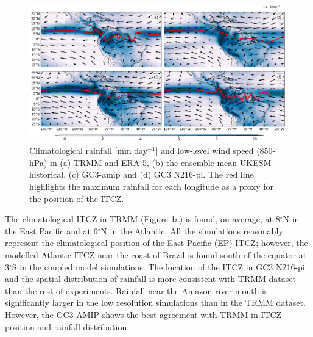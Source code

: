 \begin{figure}[t!]
\centering
 \includegraphics[width=\linewidth]{figures/itcz_clim_d.png}
\caption{ Climatological rainfall [mm day$^{-1}$] and low-level wind speed (850-hPa) in (a) TRMM and ERA-5, (b) the ensemble-mean UKESM-historical, (c) GC3-amip and (d) GC3 N216-pi. The red line highlights the maximum rainfall for each longitude as a proxy for the position of the ITCZ.  }
\label{fig:3}
\end{figure}

The climatological ITCZ in TRMM (Figure \ref{fig:3}a) is found, on average, at 8$^\circ$N in the East Pacific and at 6$^\circ$N in the Atlantic.
All the simulations reasonably represent the climatological position of the East Pacific (EP) ITCZ; however, the modelled Atlantic ITCZ near the coast of Brazil is found south of the equator at 3$^\circ$S in the coupled model simulations.
The location of the ITCZ in GC3 N216-pi and the spatial distribution of rainfall is more consistent with TRMM dataset than the rest of experiments.
Rainfall near the Amazon river mouth is significantly larger in the low resolution simulations than in the TRMM dataset. 
 However, the GC3 AMIP shows the best agreement with TRMM in ITCZ position and rainfall distribution. 

